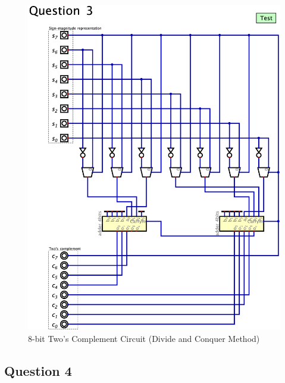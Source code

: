 \documentclass[conference]{IEEEtran}
\begin{document}
    \begin{figure}[h!]
        \centering
        \includegraphics[width=\textwidth]{assets/twos_complement_dq.png}
        \caption{8-bit Two's Complement Circuit (Divide and Conquer Method)}
        \label{fig:tc-dq}
        \end{figure}
    
\subsection{Question 4}
\end{document}
